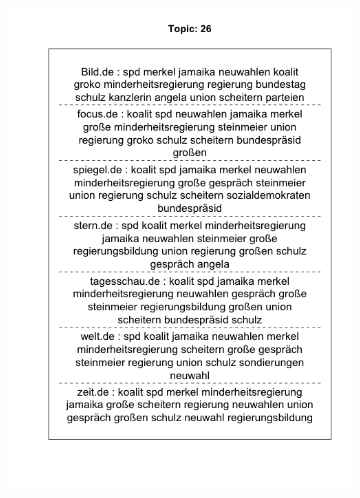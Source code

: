\documentclass[12pt,a4paper,notitlepage]{article}
\begin{document}
\begin{figure}[H]
	\begin{center}
		\begin{subfigure}[normla]{0.49\textwidth}
			\includegraphics[width=\textwidth]{figs/plotquote26.png}
		\end{subfigure}
		\begin{subfigure}[normla]{0.49\textwidth}

\end{subfigure}
\end{center}
\end{figure}
\end{document}
